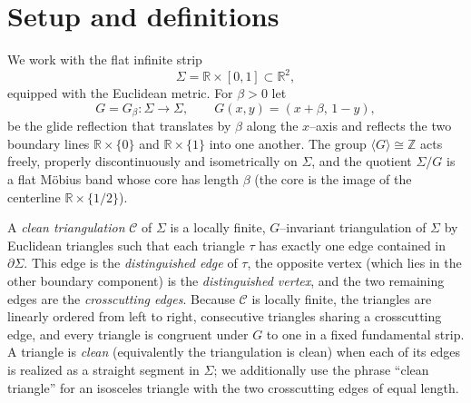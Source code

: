 
\section{Setup and definitions}

We work with the flat infinite strip
\[
\Sigma=\mathbb{R}\times[0,1]\subset\mathbb{R}^2 ,
\]
equipped with the Euclidean metric. For $\beta>0$ let
\[
G=G_\beta\colon \Sigma\to\Sigma,\qquad G(x,y)=(x+\beta,\,1-y),
\]
be the glide reflection that translates by $\beta$ along the $x$--axis and reflects the
two boundary lines $\mathbb{R}\times\{0\}$ and $\mathbb{R}\times\{1\}$ into one another.
The group $\langle G\rangle\cong\mathbb{Z}$ acts freely, properly discontinuously and
isometrically on $\Sigma$, and the quotient $\Sigma/G$ is a flat Möbius band whose
core has length $\beta$ (the core is the image of the centerline $\mathbb{R}\times\{1/2\}$).

\begin{definition}
A \emph{clean triangulation} $\mathcal{C}$ of $\Sigma$ is a locally finite,
$G$--invariant triangulation of $\Sigma$ by Euclidean triangles such that
each triangle $\tau$ has exactly one edge contained in $\partial\Sigma$.
This edge is the \emph{distinguished edge} of $\tau$, the opposite vertex
(which lies in the other boundary component) is the \emph{distinguished vertex},
and the two remaining edges are the \emph{crosscutting edges}.
Because $\mathcal{C}$ is locally finite, the triangles are linearly ordered from
left to right, consecutive triangles sharing a crosscutting edge, and every
triangle is congruent under $G$ to one in a fixed fundamental strip.
A triangle is \emph{clean} (equivalently the triangulation is clean) when each of
its edges is realized as a straight segment in $\Sigma$; we additionally use the
phrase ``clean triangle'' for an isosceles triangle with the two crosscutting
edges of equal length.
\end{definition}

